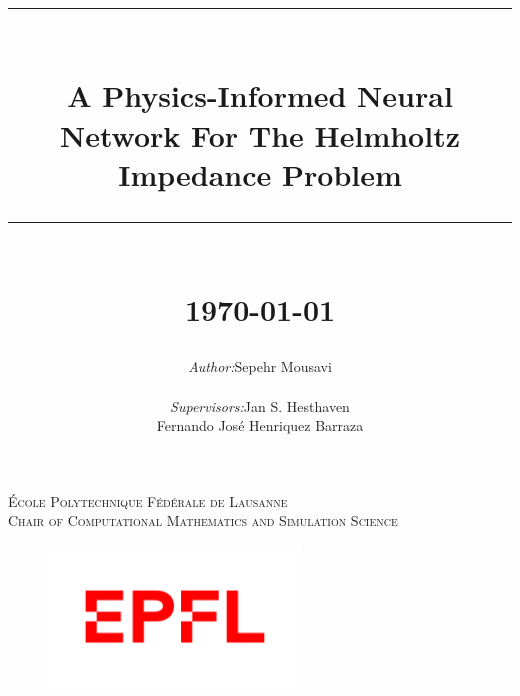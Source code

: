 \documentclass[12pt, a4paper]{article}
\title{
		\rule{\linewidth}{0.5mm}\\
		\Large \textbf{{A Physics-Informed Neural Network For The Helmholtz Impedance Problem}}
		\rule{\linewidth}{0.5mm}\\
		\normalsize \today\\[1.5cm]
}
\author{
	\begin{tabular}{lll}
		\textit{Author:} & Sepehr Mousavi\\
		& \\
		\textit{Supervisors:} & Jan S. Hesthaven\\
		\textit{} & Fernando José Henriquez Barraza\\
	\end{tabular}
}
\begin{document}
	\begin{titlepage}
		\center

		\makeatletter
		\def\printauthor{{\centering \large \@author}}
		\makeatother

		\makeatletter
		\def\printtitle{{\centering \@title\par}}
		\makeatother

		\textsc{
			\large École Polytechnique Fédérale de Lausanne\\
			\large Chair of Computational Mathematics and Simulation Science
		}\\[1cm]
		\vspace{3cm}
		\printtitle
		\vspace{2cm}
		\printauthor
		\vfill
		\begin{figure}[h]
			\centering
			\includegraphics[width = 0.6\textwidth]{img/logo.png}
		\end{figure}

	\end{titlepage}

	\tableofcontents
	\thispagestyle{plain}
	\newpage

	\begin{abstract}
		
	\end{abstract}

	
	
	
\end{document}
